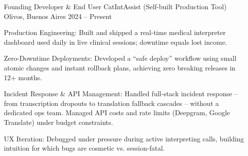 \documentclass[]{awesome-cv}
\begin{document}
\begin{cventries}

	\cventry
	{Founding Developer \& End User}
	{CatIntAssist (Self-built Production Tool)}
	{Olivos, Buenos Aires}
	{2024 -- Present}
	{\begin{cvitems}
		\vspace{0.5mm}
		\item {Production Engineering: Built and shipped a real-time medical interpreter dashboard used daily in live clinical sessions; downtime equals lost income.}
		\item {Zero-Downtime Deployments: Developed a ``safe deploy'' workflow using small atomic changes and instant rollback plans, achieving zero breaking releases in 12+ months.}
		\item {Incident Response \& API Management: Handled full-stack incident response -- from transcription dropouts to translation fallback cascades -- without a dedicated ops team. Managed API costs and rate limits (Deepgram, Google Translate) under budget constraints.}
		\item {UX Iteration: Debugged under pressure during active interpreting calls, building intuition for which bugs are cosmetic vs. session-fatal.}
	\end{cvitems}}

\end{cventries}
\end{document}
